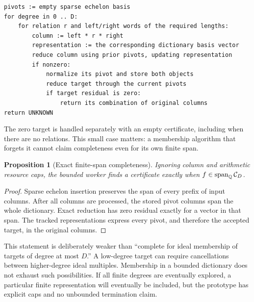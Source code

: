 \documentclass[11pt,letterpaper]{article}
\newcommand{\Q}{\mathbb Q}\newcommand{\R}{\mathbb R}\newcommand{\N}{\mathbb N}
\newtheorem{proposition}[theorem]{Proposition}
\theoremstyle{definition}\newtheorem{definition}[theorem]{Definition}
\theoremstyle{remark}\newtheorem{remark}[theorem]{Remark}
\begin{document}
\par\noindent\begin{minipage}{\linewidth}
\begin{lstlisting}
pivots := empty sparse echelon basis
for degree in 0 .. D:
    for relation r and left/right words of the required lengths:
        column := left * r * right
        representation := the corresponding dictionary basis vector
        reduce column using prior pivots, updating representation
        if nonzero:
            normalize its pivot and store both objects
            reduce target through the current pivots
            if target residual is zero:
                return its combination of original columns
return UNKNOWN
\end{lstlisting}
\end{minipage}\par\smallskip

The zero target is handled separately with an empty certificate, including
when there are no relations. This small case matters: a membership algorithm
that forgets it cannot claim completeness even for its own finite span.

\begin{proposition}[Exact finite-span completeness]
Ignoring column and arithmetic resource caps, the bounded worker finds a
certificate exactly when $f\in\Span_\Q\mathcal C_D$.
\end{proposition}
\begin{proof}
Sparse echelon insertion preserves the span of every prefix of input columns.
After all columns are processed, the stored pivot columns span the whole
dictionary. Exact reduction has zero residual exactly for a vector in that
span. The tracked representations express every pivot, and therefore the
accepted target, in the original columns.
\end{proof}

This statement is deliberately weaker than ``complete for ideal membership of
targets of degree at most $D$.'' A low-degree target can require cancellations
between higher-degree ideal multiples. Membership in a bounded dictionary does
not exhaust such possibilities. If all finite degrees are eventually explored,
a particular finite representation will eventually be included, but the
prototype has explicit caps and no unbounded termination claim.
\end{document}
